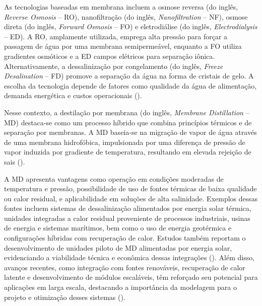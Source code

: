 As tecnologias baseadas em membrana incluem a osmose reversa (do inglês, \textit{Reverse Osmosis} -- RO), nanofiltração (do inglês, \textit{Nanofiltration} -- NF), osmose direta (do inglês, \textit{Forward Osmosis} -- FO) e eletrodiálise (do inglês, \textit{Electrodialysis} -- ED). A RO, amplamente utilizada, emprega alta pressão para forçar a passagem de água por uma membrana semipermeável, enquanto a FO utiliza gradientes osmóticos e a ED campos elétricos para separação iônica. Alternativamente, a dessalinização por congelamento (do inglês, \textit{Freeze Desalination} -- FD) promove a separação da água na forma de cristais de gelo. A escolha da tecnologia depende de fatores como qualidade da água de alimentação, demanda energética e custos operacionais (\cite{Abid2020DesalinationOverview}).

Nesse contexto, a destilação por membrana (do inglês, \textit{Membrane Distillation} -- MD) destaca-se como um processo híbrido que combina princípios térmicos e de separação por membranas. A MD baseia-se na migração de vapor de água através de uma membrana hidrofóbica, impulsionada por uma diferença de pressão de vapor induzida por gradiente de temperatura, resultando em elevada rejeição de sais (\cite{Abid2020DesalinationOverview,Cath2010}).

A MD apresenta vantagens como operação em condições moderadas de temperatura e pressão, possibilidade de uso de fontes térmicas de baixa qualidade ou calor residual, e aplicabilidade em soluções de alta salinidade. Exemplos dessas fontes incluem sistemas de dessalinização alimentados por energia solar térmica, unidades integradas a calor residual proveniente de processos industriais, usinas de energia e sistemas marítimos, bem como o uso de energia geotérmica e configurações híbridas com recuperação de calor. Estudos também reportam o desenvolvimento de unidades piloto de MD alimentadas por energia solar, evidenciando a viabilidade técnica e econômica dessas integrações (\cite{Yadav2021MDLowGradeEnergy}). Além disso, avanços recentes, como integração com fontes renováveis, recuperação de calor latente e desenvolvimento de módulos escaláveis, têm reforçado seu potencial para aplicações em larga escala, destacando a importância da modelagem para o projeto e otimização desses sistemas (\cite{Cath2010,Leaper2021,Warsinger2017,Parani2021,AndresManas2022}).

